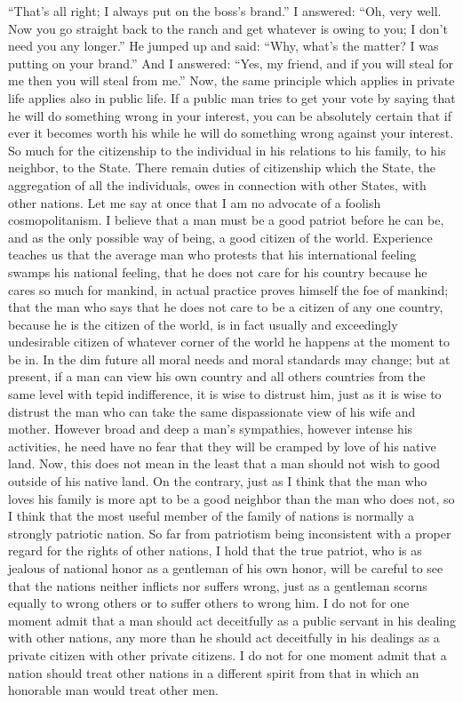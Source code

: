 \documentclass{scrbook}
\begin{document}
“That’s all right; I always put on the boss’s brand.” I answered: “Oh, very well. Now you go
straight back to the ranch and get whatever is owing to you; I don’t need you any longer.”
He jumped up and said: “Why, what’s the matter? I was putting on your brand.” And I
answered: “Yes, my friend, and if you will steal for me then you will steal from me.”
Now, the same principle which applies in private life applies also in public life. If
a public man tries to get your vote by saying that he will do something wrong in your
interest, you can be absolutely certain that if ever it becomes worth his while he will do
something wrong against your interest. So much for the citizenship to the individual in
his relations to his family, to his neighbor, to the State. There remain duties of citizenship
which the State, the aggregation of all the individuals, owes in connection with other States,
with other nations. Let me say at once that I am no advocate of a foolish cosmopolitanism.
I believe that a man must be a good patriot before he can be, and as the only possible way
of being, a good citizen of the world. Experience teaches us that the average man who
protests that his international feeling swamps his national feeling, that he does not care for
his country because he cares so much for mankind, in actual practice proves himself the foe
of mankind; that the man who says that he does not care to be a citizen of any one country,
because he is the citizen of the world, is in fact usually and exceedingly undesirable citizen
of whatever corner of the world he happens at the moment to be in. In the dim future all
moral needs and moral standards may change; but at present, if a man can view his own
country and all others countries from the same level with tepid indifference, it is wise to
distrust him, just as it is wise to distrust the man who can take the same dispassionate view
of his wife and mother. However broad and deep a man’s sympathies, however intense his
activities, he need have no fear that they will be cramped by love of his native land.
Now, this does not mean in the least that a man should not wish to good outside of his
native land. On the contrary, just as I think that the man who loves his family is more apt to
be a good neighbor than the man who does not, so I think that the most useful member of
the family of nations is normally a strongly patriotic nation. So far from patriotism being
inconsistent with a proper regard for the rights of other nations, I hold that the true patriot,
who is as jealous of national honor as a gentleman of his own honor, will be careful to
see that the nations neither inflicts nor suffers wrong, just as a gentleman scorns equally to
wrong others or to suffer others to wrong him. I do not for one moment admit that a man
should act deceitfully as a public servant in his dealing with other nations, any more than
he should act deceitfully in his dealings as a private citizen with other private citizens. I do
not for one moment admit that a nation should treat other nations in a different spirit from
that in which an honorable man would treat other men.
\end{document}
